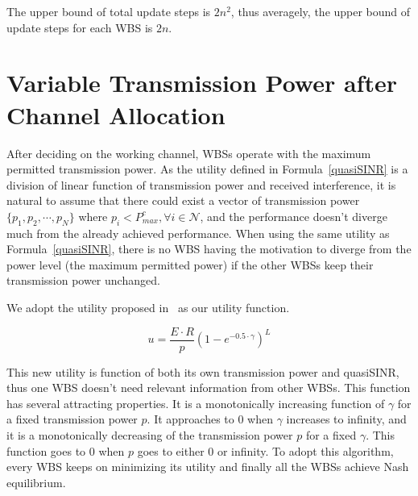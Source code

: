 The upper bound of total update steps is $2n^2$, thus averagely, the upper bound of update steps for each WBS is $2n$.



\section{Variable Transmission Power after Channel Allocation}
\label{powerAllocation}
After deciding on the working channel, WBSs operate with the maximum permitted transmission power.
As the utility defined in Formula~\ref{quasiSINR} is a division of linear function of transmission power and received interference, it is natural to assume that there could exist a vector of transmission power $\{p_1, p_2, \cdots, p_N\}$ where $p_i<P_{max}^c,\forall i\in \mathcal{N}$, and the performance doesn't diverge much from the already achieved performance.
When using the same utility as Formula~\ref{quasiSINR}, there is no WBS having the motivation to diverge from the power level (the maximum permitted power) if the other WBSs keep their transmission power unchanged.

We adopt the utility proposed in~\cite{power_control_utility_98} as our utility function.

\[u= \dfrac{E\cdot R}{p}(1-e^{-0.5\cdot \gamma})^L\]

This new utility is function of both its own transmission power and quasiSINR, thus one WBS doesn't need relevant information from other WBSs. 
This function has several attracting properties.
It is a monotonically increasing function of $\gamma$ for a fixed transmission power $p$.
It approaches to 0 when $\gamma$ increases to infinity, and it is a monotonically decreasing of the transmission power $p$ for a fixed $\gamma$.
This function goes to 0 when $p$ goes to either 0 or infinity.
To adopt this algorithm, every WBS keeps on minimizing its utility and finally all the WBSs achieve Nash equilibrium.
 






